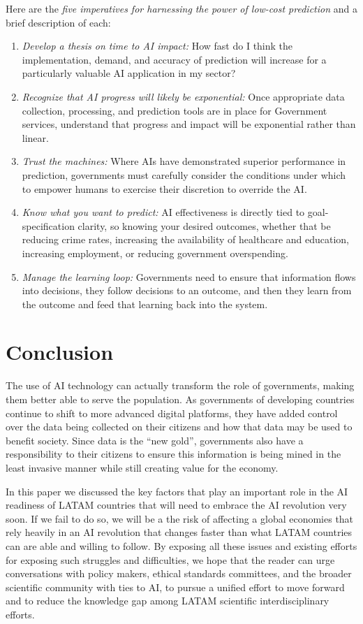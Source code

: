 \documentclass[conference]{IEEEtran}
\begin{document}
Here are the \emph{five imperatives for harnessing the power of low-cost prediction} and a brief description of each:
\begin{enumerate}
  \item \emph{Develop a thesis on time to AI impact:} How fast do I think the implementation, demand, and accuracy of prediction will increase for a particularly valuable AI application in my sector?
  \item \emph{Recognize that AI progress will likely be exponential:} Once appropriate data collection, processing, and prediction tools are in place for Government services, understand that progress and impact will be exponential rather than linear.
  \item \emph{Trust the machines:} Where AIs have demonstrated superior performance in prediction, governments must carefully consider the conditions under which to empower humans to exercise their discretion to override the AI.
  \item \emph{Know what you want to predict:} AI effectiveness is directly tied to goal-specification clarity, so knowing your desired outcomes, whether that be reducing crime rates, increasing the availability of healthcare and education, increasing employment, or reducing government overspending.
  \item \emph{Manage the learning loop:} Governments need to ensure that information flows into decisions, they follow decisions to an outcome, and then they learn from the outcome and feed that learning back into the system.
\end{enumerate}


\section{Conclusion}

The use of AI technology can actually transform the role of governments, making them better able to serve the population. As governments of developing countries continue to shift to more advanced digital platforms, they have added control over the data being collected on their citizens and how that data may be used to benefit society. Since data is the ``new gold'', governments also have a responsibility to their citizens to ensure this information is being mined in the least invasive manner while still creating value for the economy.

In this paper we discussed the key factors that play an important role in the AI readiness of LATAM countries that will need to embrace the AI revolution very soon. If we fail to do so, we will be a the risk of affecting a global economies that rely heavily in an AI revolution that changes faster than what LATAM countries can are able and willing to follow. By exposing all these issues and existing efforts for exposing such struggles and difficulties, we hope that the reader can urge conversations with policy makers, ethical standards committees, and the broader scientific community with ties to AI, to pursue a unified effort to move forward and to reduce the knowledge gap among LATAM scientific interdisciplinary efforts.
\end{document}
